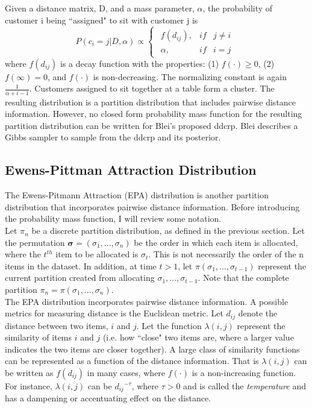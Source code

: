 \noindent
Given a distance matrix, D, and a mass parameter, $\alpha$, the probability
of customer i being ``assigned" to sit with customer j is 
\begin{equation}
  P(c_i=j|D,\alpha) \propto 
  \begin{cases}
    \begin{array}{rll}
      f(d_{ij}), & if & j \ne i\\
      \alpha,    & if & i=j
    \end{array}  
  \end{cases}
\end{equation}
where $f(d_{ij})$ is a decay function with the properties: (1) $f(\cdot) \ge 0$,
(2) $f(\infty) = 0$, and $f(\cdot)$ is non-decreasing. The normalizing constant 
is again $\frac{1}{\alpha+i-1}$. Customers assigned to sit together at a table
form a cluster. The resulting distribution is a partition distribution that
includes pairwise distance information. However, no closed form probability 
mass function for the resulting partition distribution can be written for 
Blei's proposed ddcrp. Blei describes a Gibbs sampler to sample from the 
ddcrp and its posterior.

\subsection{Ewens-Pittman Attraction Distribution}
The Ewens-Pitmann Attraction (EPA) distribution is another partition
distribution that incorporates pairwise distance information. Before
introducing the probability mass function, I will review some notation.\\

\noindent
Let $\pi_n$ be a discrete partition distribution, as defined in the previous
section. Let the permutation $\bm \sigma = (\sigma_1,...,\sigma_n)$ be the order
in which each item is allocated, where the $t^{th}$ item to be allocated is
$\sigma_t$. This is not necessarily the order of the n items in the dataset. In
addition, at time $t > 1$, let $\pi(\sigma_{1},...,\sigma_{t-1})$ represent the
current partition created from allocating $\sigma_{1},...,\sigma_{t-1}$. Note
that the complete partition $\pi_n = \pi(\sigma_{1},...,\sigma_{n})$.\\

\noindent
The EPA distribution incorporates pairwise distance information. A possible
metrics for measuring distance is the Euclidean metric. Let $d_{ij}$ denote the
distance between two items, $i$ and $j$. Let the function $\lambda(i,j)$ represent
the similarity of items $i$ and $j$ (i.e. how ``close" two items are, where a larger
value indicates the two items are closer together). A large class of similarity
functions can be represented as a function of the distance information. That is
$\lambda(i,j)$ can be written as $f(d_{ij})$ in many cases, where $f(\cdot)$ is a
non-increasing function. For instance, $\lambda(i,j)$ can be ${d_{ij}}^{-\tau}$,
where $\tau>0$ and is called the \textit{temperature} and has a dampening or
accentuating effect on the distance.\\

